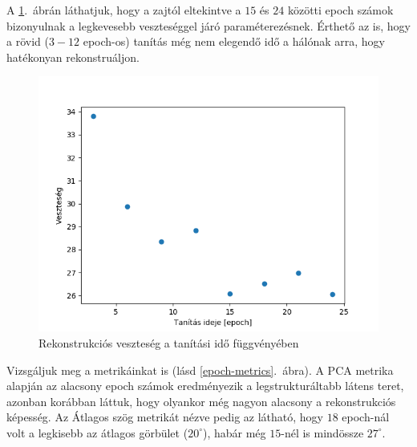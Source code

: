 A \ref{epoch-loss}.~ábrán láthatjuk, hogy a zajtól eltekintve a $15$ és $24$ közötti epoch számok bizonyulnak a legkevesebb veszteséggel járó paraméterezésnek. Érthető az is, hogy a rövid ($3-12$ epoch-os) tanítás még nem elegendő idő a hálónak arra, hogy hatékonyan rekonstruáljon.

\begin{figure}[h!]
\begin{center}
 \begin{center}
	\includegraphics[width=0.75\linewidth]{metrics/vae_epoch-loss.png}
 \end{center}

  \caption{Rekonstrukciós veszteség a tanítási idő függvényében}\label{epoch-loss}
\end{center}
\end{figure}

Vizsgáljuk meg a metrikáinkat is (lásd \ref{epoch-metrics}.~ábra). A PCA metrika alapján az alacsony epoch számok eredményezik a legstrukturáltabb látens teret, azonban korábban láttuk, hogy olyankor még nagyon alacsony a rekonstrukciós képesség. Az Átlagos szög metrikát nézve pedig az látható, hogy $18$ epoch-nál volt a legkisebb az átlagos görbület ($20^\circ$), habár még $15$-nél is mindössze $27^\circ$.

